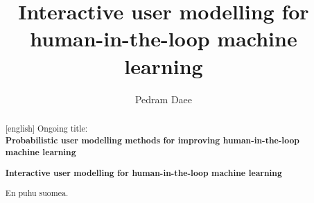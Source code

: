 \documentclass[dissertation,math,vertlayout,pdfa,colorlinks]{aaltoseries}
\author{Pedram Daee}
\title{Interactive user modelling for human-in-the-loop machine learning} %
\begin{document}





\begin{abstract}[english]
	Ongoing title: \\
	\textbf{Probabilistic user modelling methods for improving human-in-the-loop machine learning}
	
	\textbf{Interactive user modelling for human-in-the-loop machine learning} %
	
	
	
	
	
\end{abstract}



 
\begin{abstract}%
En puhu suomea.
\end{abstract}
\end{document}
